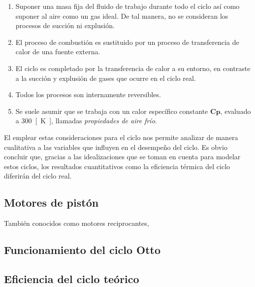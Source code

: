 \documentclass{article}
\begin{document}
            \begin{enumerate}[i]
                \item Suponer una masa fija del fluido de trabajo durante todo el ciclo as\'{i} como suponer al aire como un gas ideal. De tal manera, no se
                consideran los procesos de succi\'{o}n ni explusi\'{o}n.

                \item El proceso de combusti\'{o}n es sustituido por un proceso de transferencia de calor de una fuente externa.

                \item El ciclo es completado por la transferencia de calor a su entorno, en contraste a la succi\'{o}n y explusi\'{o}n de gases que ocurre
                en el ciclo real.

                \item Todos los procesos son internamente reversibles.

                \item Se suele asumir que se trabaja con un calor espec\'{i}fico constante $\bm{Cp}$, evaluado a \SI{300}{[\kelvin]}, llamadas
                \textit{propiedades de aire fr\'{i}o}.
                
            \end{enumerate}

            El emplear estas consideraciones para el ciclo nos permite analizar de manera cualitativa a las variables que influyen en el desempe\~{n}o del ciclo.
            Es obvio concluir que, gracias a las idealizaciones que se toman en cuenta para modelar estos ciclos, los resultados cuantitativos como la 
            eficiencia t\'{e}rmica del ciclo diferir\'{a}n del ciclo real.
        
        \subsection{Motores de pist\'{o}n}
            Tambi\'{e}n conocidos como motores reciprocantes, 
        \subsection{Funcionamiento del ciclo Otto}
        
        \subsection{Eficiencia del ciclo te\'{o}rico}
\end{document}
